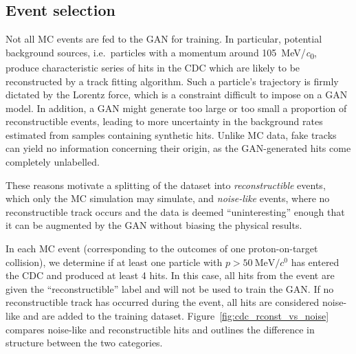 \subsection{Event selection}


Not all MC events are fed to the GAN for training. In particular, potential
background sources, i.e.\ particles with a momentum around
\SI{105}{MeV/\clight}, produce characteristic series of hits in the CDC which
are likely to be reconstructed by a track fitting algorithm. Such a particle's
trajectory is firmly dictated by the Lorentz force, which is a constraint
difficult to impose on a GAN model. In addition, a GAN might generate too large
or too small a proportion of reconstructible events, leading to more uncertainty
in the background rates estimated from samples containing synthetic hits. Unlike
MC data, fake tracks can yield no information concerning their origin, as the
GAN-generated hits come completely unlabelled.

These reasons motivate a splitting of the dataset into \emph{reconstructible}
events, which only the MC simulation may simulate, and \emph{noise-like} events,
where no reconstructible track occurs and the data is deemed ``uninteresting''
enough that it can be augmented by the GAN without biasing the physical results.


In each MC event (corresponding to the outcomes of one proton-on-target
collision), we determine if at least one particle with $p >
\SI{50}{\MeV/\clight}$ has entered the CDC and produced at least 4 hits. In this
case, all hits from the event are given the ``reconstructible'' label and will
not be used to train the GAN. If no reconstructible track has occurred during
the event, all hits are considered noise-like and are added to the training
dataset. Figure~\ref{fig:cdc_rconst_vs_noise} compares noise-like and
reconstructible hits and outlines the difference in structure between the two
categories.

